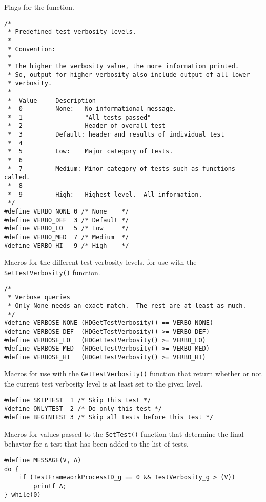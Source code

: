 \documentclass[../HDF5_RFC.tex]{subfiles}
\begin{document}
Flags for the  function.

\begin{verbatim}
/*
 * Predefined test verbosity levels.
 *
 * Convention:
 *
 * The higher the verbosity value, the more information printed.
 * So, output for higher verbosity also include output of all lower
 * verbosity.
 *
 *  Value     Description
 *  0         None:   No informational message.
 *  1                 "All tests passed"
 *  2                 Header of overall test
 *  3         Default: header and results of individual test
 *  4
 *  5         Low:    Major category of tests.
 *  6
 *  7         Medium: Minor category of tests such as functions called.
 *  8
 *  9         High:   Highest level.  All information.
 */
#define VERBO_NONE 0 /* None    */
#define VERBO_DEF  3 /* Default */
#define VERBO_LO   5 /* Low     */
#define VERBO_MED  7 /* Medium  */
#define VERBO_HI   9 /* High    */
\end{verbatim}

Macros for the different test verbosity levels, for use with the \texttt{SetTestVerbosity()} function.

\begin{verbatim}
/*
 * Verbose queries
 * Only None needs an exact match.  The rest are at least as much.
 */
#define VERBOSE_NONE (HDGetTestVerbosity() == VERBO_NONE)
#define VERBOSE_DEF  (HDGetTestVerbosity() >= VERBO_DEF)
#define VERBOSE_LO   (HDGetTestVerbosity() >= VERBO_LO)
#define VERBOSE_MED  (HDGetTestVerbosity() >= VERBO_MED)
#define VERBOSE_HI   (HDGetTestVerbosity() >= VERBO_HI)
\end{verbatim}

Macros for use with the \texttt{GetTestVerbosity()} function that return whether or not the current
test verbosity level is at least set to the given level.

\begin{verbatim}
#define SKIPTEST  1 /* Skip this test */
#define ONLYTEST  2 /* Do only this test */
#define BEGINTEST 3 /* Skip all tests before this test */
\end{verbatim}

Macros for values passed to the \texttt{SetTest()} function that determine the final behavior for a
test that has been added to the list of tests.

\begin{verbatim}
#define MESSAGE(V, A)
do {
    if (TestFrameworkProcessID_g == 0 && TestVerbosity_g > (V))
        printf A;
} while(0)
\end{verbatim}
\end{document}
